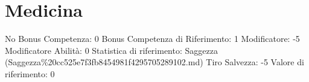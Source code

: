 \section{Medicina}\label{medicina}

\begin{description}
\tightlist
\item[Tags: ABI]
No Bonus Competenza: 0 Bonus Competenza di Riferimento: 1 Modificatore:
-5 Modificatore Abilità: 0 Statistica di riferimento: Saggezza
(Saggezza\%20cc525e7f3fb8454981f4295705289102.md) Tiro Salvezza: -5
Valore di riferimento: 0
\end{description}
